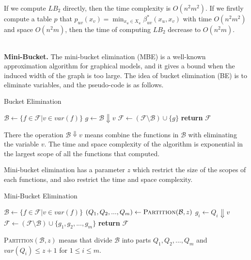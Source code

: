 If we compute $LB_2$ directly, then the time complexity is $O(n^2m^2)$. If we firstly compute a table $p$ that $p_{uv}(x_v)=\min_{x_u\in X_u}\beta_{uv}^*(x_u,x_v)$ with time $O(n^2m^2)$ and space $O(n^2m)$, then the time of computing $LB_2$ decrease to $O(n^2m)$.

\ \\

\noindent\textbf{Mini-Bucket.}
The mini-bucket elimination (MBE) is a well-known approximation algorithm for graphical models, and it gives a bound when the induced width of the graph is too large. The idea of bucket elimination (BE) is to eliminate variables, and the pseudo-code is as follows.

\begin{algorithm}[!h]
\caption{Bucket Elimination}
\begin{algorithmic}[1]
    \State $\mathcal{B} \gets \{f\in\mathcal{F}|v\in var(f)\}$
    \State $g \gets \mathcal{B}\Downarrow v$
    \State $\mathcal{F} \gets (\mathcal{F}\setminus \mathcal{B})\cup\{g\}$
    \State \textbf{return }$\mathcal{F}$
\EndFunction
\end{algorithmic}
\end{algorithm}

There the operation $\mathcal{B}\Downarrow v$ means combine the functions in $\mathcal{B}$ with eliminating the variable $v$. The time and space complexity of the algorithm is exponential in the largest scope of all the functions that computed.

Mini-bucket elimination has a parameter $z$ which restrict the size of the scopes of each functions, and also restrict the time and space complexity.
\begin{algorithm}
\caption{Mini-Bucket Elimination}
\begin{algorithmic}[1]
    \State $\mathcal{B} \gets \{f\in\mathcal{F}|v\in var(f)\}$
    \State $(Q_1,Q_2,...,Q_m) \gets \textsc{Partition}(\mathcal{B},z)$
        \State $g_i\gets Q_i\Downarrow v$
    \EndFor
    \State $\mathcal{F} \gets (\mathcal{F}\setminus \mathcal{B})\cup\{g_1,g_2,...,g_m\}$
    \State \textbf{return }$\mathcal{F}$
\EndFunction
\end{algorithmic}
\end{algorithm}

\textsc{Partition}$(\mathcal{B},z)$ means that divide $\mathcal{B}$ into parts $Q_1,Q_2,...,Q_m$ and $var(Q_i)\le z+1$ for $1\le i\le m$.

